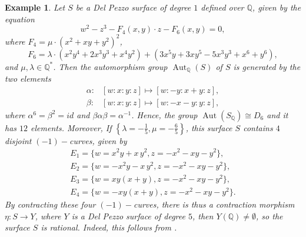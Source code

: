 \documentclass[leqno,12pt]{amsart} %
\newtheorem{ex}[thm]{Example}
\newcommand{\Q}{\ensuremath{\mathbb{Q} }}
\DeclareMathOperator{\Aut}{Aut}
\begin{document}
\begin{ex}\label{ex-10}
Let $S$ be a Del Pezzo surface of degree $1$ defined over $\Q $, given by the equation
\[ w^2 - z^3 - F_4(x, y)\cdot z - F_6(x,y)=0,\]
where $F_4=\mu\cdot (x^2+xy+y^2)^2$,
\[F_6= \lambda\cdot(x^2y^4+2x^3y^3+x^4y^2)+(3x^5y+3xy^5-5x^3y^3+x^6+y^6),\]
and $\mu,\lambda\in\Q^*$. Then the automorphism group $\Aut_{\Q}(S)$ of $S$ is generated by the two elements 
\begin{eqnarray*}
    \alpha:&[w:x:y:z]\mapsto[w:-y:x+y:z],\\
   \beta:&[w:x:y:z]\mapsto[w:-x-y:y:z],
\end{eqnarray*}
where $\alpha^6=\beta^2=id$ and $\beta\alpha\beta=\alpha^{-1}$. Hence, the group $\Aut(S_{\Q})\cong D_6$ and it has $12$ elements. Moreover, If $\left\{\lambda = -{\frac{1}{5}}, \mu = -{\frac{6}{5}} \right\}$, this surface $S$ contains $4$ disjoint $(-1)-$curves, given by
  \[ \begin{array}{l}
          E_1=\{ w = x^{2} y +x \,y^{2}, z = -x^{2}-x y -y^{2}\},\\
          E_2=\{w = -x^{2} y -x \,y^{2}, z = -x^{2}-x y -y^{2}\},\\
        E_3=\{w = xy \left(x +y \right) , z = -x^{2}-x y -y^{2}\},\\
        E_4=\{{w = -xy(x + y), z = -x^2 - xy - y^2}\}.
    \end{array}\]
By contracting these four $(-1)-$curves, there is thus a contraction morphism $\eta: S\rightarrow Y$, where $Y$ is a Del Pezzo surface of degree $5$, then $Y(\Q )\neq\emptyset$, so the surface $S$ is rational. Indeed, this follows from \cite[Theorem 3.15]{MR225780}. 
\end{ex}


\end{document}

